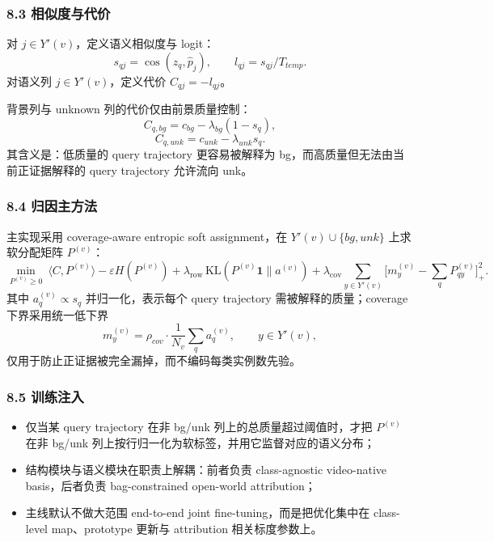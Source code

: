 \documentclass[UTF8]{ctexart}
\begin{document}
\subsubsection*{8.3 相似度与代价}
对 $j\in Y'(v)$，定义语义相似度与 logit：
\[
 s_{qj}=\cos(z_q,\hat p_j),\qquad l_{qj}=s_{qj}/T_{temp}.
\]
对语义列 $j\in Y'(v)$，定义代价 $C_{qj}=-l_{qj}$。

背景列与 unknown 列的代价仅由前景质量控制：
\[
 C_{q,bg}=c_{bg}-\lambda_{bg}(1-s_q),
\]
\[
 C_{q,unk}=c_{unk}-\lambda_{unk}s_q.
\]
其含义是：低质量的 query trajectory 更容易被解释为 bg，而高质量但无法由当前正证据解释的 query trajectory 允许流向 unk。

\subsubsection*{8.4 归因主方法}
主实现采用 coverage-aware entropic soft assignment，在 $Y'(v)\cup\{bg,unk\}$ 上求软分配矩阵 $P^{(v)}$：
\[
 \min_{P^{(v)}\ge 0}\ \langle C,P^{(v)}\rangle - \varepsilon H(P^{(v)})
 + \lambda_{\mathrm{row}}\,\mathrm{KL}(P^{(v)}\mathbf 1\|a^{(v)})
 + \lambda_{\mathrm{cov}}\sum_{y\in Y'(v)} \Big[m_y^{(v)}-\sum_q P^{(v)}_{qy}\Big]_+^2.
\]
其中 $a_q^{(v)}\propto s_q$ 并归一化，表示每个 query trajectory 需被解释的质量；coverage 下界采用统一低下界
\[
 m_y^{(v)}=\rho_{cov}\cdot \frac{1}{N_v}\sum_q a_q^{(v)},\qquad y\in Y'(v),
\]
仅用于防止正证据被完全漏掉，而不编码每类实例数先验。

\subsubsection*{8.5 训练注入}
\begin{itemize}
\item 仅当某 query trajectory 在非 bg/unk 列上的总质量超过阈值时，才把 $P^{(v)}$ 在非 bg/unk 列上按行归一化为软标签，并用它监督对应的语义分布；
\item 结构模块与语义模块在职责上解耦：前者负责 class-agnostic video-native basis，后者负责 bag-constrained open-world attribution；
\item 主线默认不做大范围 end-to-end joint fine-tuning，而是把优化集中在 class-level map、prototype 更新与 attribution 相关标度参数上。
\end{itemize}

\par\noindent\hrulefill\par
\end{document}
